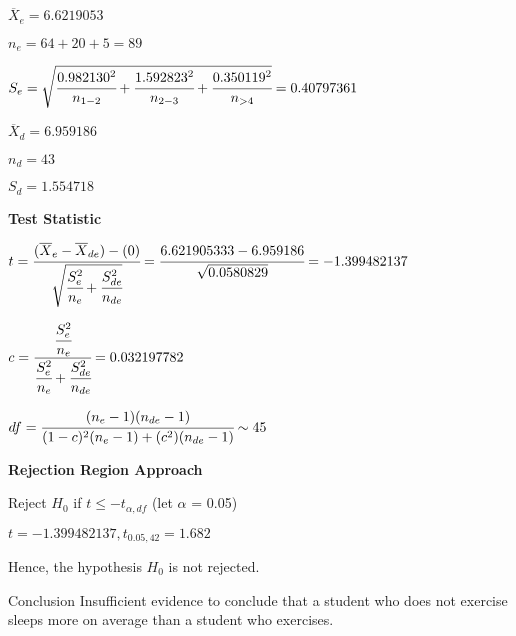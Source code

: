 \documentclass[11pt,]{beamer}
\begin{document}
\begin{frame}

$\overline{X}_{e} = 6.6219053$

\bigskip

$n_{e} = 64 + 20 + 5 = 89$

\bigskip

$S_{e} = \sqrt{\cfrac{0.982130^2}{n_{1-2}}+ \cfrac{1.592823^2}{n_{2-3}} + \cfrac{0.350119^2}{n_{>4}}} = 0.40797361$

\bigskip

$\overline{X}_{d} = 6.959186$

\bigskip

$n_{d} = 43$

\bigskip

$S_{d} = 1.554718$

\end{frame}

\begin{frame}

    \textbf{Test Statistic}
    
    \bigskip
    
    $ t = \cfrac{(\overline{X}_{e} - \overline{X}_{de}) - (0)}{\sqrt{\cfrac{S_{e}^{2}}{n_{e}} + \cfrac{S_{de}^{2}}{n_{de}}}} = \cfrac{6.621905333 - 6.959186}{\sqrt{0.0580829}} = -1.399482137$
    
    \bigskip
    
    $ c= \cfrac{\cfrac{S_{e}^{2}}{n_{e}}}{\cfrac{S_{e}^{2}}{n_{e}} + \cfrac{S_{de}^{2}}{n_{de}}} = 0.032197782$
    
    \bigskip
    
    $df = \cfrac{(n_{e} - 1)(n_{de} - 1)}{(1 - c)^{2}(n_{e}- 1) + (c^2)(n_{de} - 1)} \sim 45$
    
\end{frame}

\begin{frame}

    \textbf{Rejection Region Approach}
    
    Reject $H_0$ if $t \leq -t_{\alpha, df}$ (let $\alpha$ = 0.05)
    
    \bigskip
    
    $t = -1.399482137, t_{0.05, 42} = 1.682$ 
    
    \bigskip
    
    Hence, the hypothesis $H_{0}$ is not rejected. 
    
    \bigskip
    
    \begin{block}{Conclusion}
    Insufficient evidence to conclude that a student who does not exercise sleeps more on average than a student who exercises. 
    \end{block}
    
\end{frame}
\end{document}
